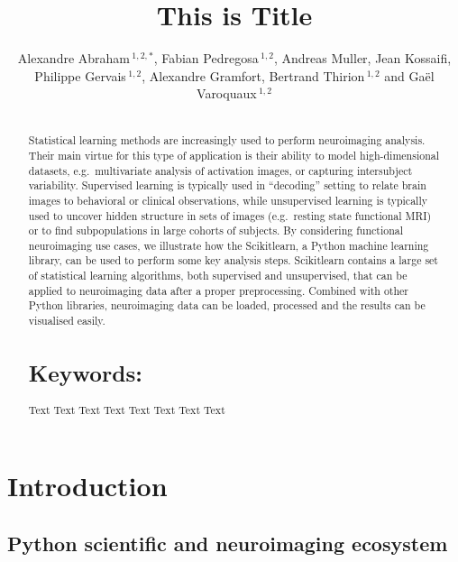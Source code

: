 \documentclass{frontiersSCNS} %
\def\firstAuthorLast{Sample {et~al}} %
\def\Authors{Alexandre Abraham\,$^{1,2,*}$, Fabian Pedregosa\,$^{1,2}$, Andreas Muller, Jean Kossaifi, Philippe Gervais\,$^{1,2}$, Alexandre Gramfort, Bertrand Thirion\,$^{1,2}$ and Gaël Varoquaux\,$^{1,2}$}
\begin{document}
\onecolumn
{}

\title[Running Title]{This is Title}
\author[\firstAuthorLast ]{\Authors}
\address{}
\correspondance{}
\editor{}

\maketitle
\begin{abstract}

\section{}
Statistical  learning  methods  are   increasingly  used  to  perform
neuroimaging  analysis.  Their  main  virtue  for this  type  of  application
is  their  ability  to   model  high-dimensional  datasets,  e.g.\ multivariate
analysis  of activation  images,  or  capturing  inter­subject  variability.
Supervised  learning  is  typically  used  in  “decoding” setting  to  relate
brain   images  to  behavioral  or  clinical  observations,  while
unsupervised  learning  is  typically used  to  uncover  hidden  structure  in
sets  of  images   (e.g.\ resting  state  functional  MRI)  or  to  find
sub­populations  in  large  cohorts  of  subjects.   By  considering
functional  neuroimaging  use  cases,  we illustrate  how  the  Scikit­learn,
a  Python machine  learning  library,  can  be used to perform  some  key
analysis steps.  Scikit­learn  contains  a  large   set  of  statistical
learning  algorithms,  both  supervised  and unsupervised, that can be  applied
to neuroimaging data after a  proper preprocessing.  Combined  with  other
Python  libraries, neuroimaging data can be loaded, processed and the results
can be visualised easily.



\tiny
  \section{Keywords:} Text Text Text Text Text Text Text Text  %
\end{abstract}


\section{Introduction}


\subsection{Python scientific and neuroimaging ecosystem}
\end{document}
